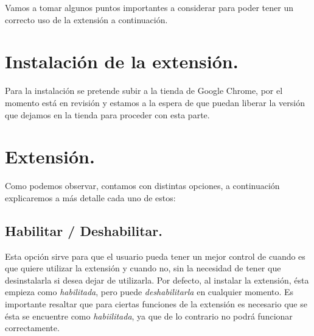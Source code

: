 \documentclass[12pt, a4paper, titlepage]{report}
\begin{document}
    Vamos a tomar algunos puntos importantes a considerar para poder tener un correcto uso de la extensión a continuación.
     
    \section{Instalación de la extensión.}
    Para la instalación se pretende subir a la tienda de Google Chrome, por el momento está en revisión y estamos a la espera de que puedan liberar la versión que dejamos en la tienda para proceder con esta parte.
    
    \section{Extensión.}
    Como podemos observar, contamos con distintas opciones, a continuación explicaremos a más detalle cada uno de estos: 
    
        \subsection{Habilitar / Deshabilitar.}
        Esta opción sirve para que el usuario pueda tener un mejor control de cuando es que quiere utilizar la extensión y cuando no, sin la necesidad de tener que desinstalarla si desea dejar de utilizarla. Por defecto, al instalar la extensión, ésta empieza como \textit{habilitada}, pero puede \textit{deshabilitarla} en cualquier momento. Es importante resaltar que para ciertas funciones de la extensión es necesario que se ésta se encuentre como \textit{habiilitada}, ya que de lo contrario no podrá funcionar correctamente.
        
\end{document}
